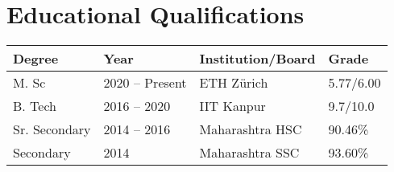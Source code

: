 \section*{Educational Qualifications}
\begin{tabulary}{\textwidth}{L L L L}

\toprule
\textbf{Degree} & \textbf{Year} & \textbf{Institution/Board} & \textbf{Grade}\\
\midrule
M. Sc & 2020 -- Present & ETH Zürich & 5.77/6.00\\%
B. Tech & 2016 -- 2020 & IIT Kanpur & 9.7/10.0\\%
Sr. Secondary & 2014 -- 2016 & Maharashtra HSC & 90.46\%\\%
Secondary & 2014 & Maharashtra SSC & 93.60\%\\
\bottomrule

\end{tabulary}

